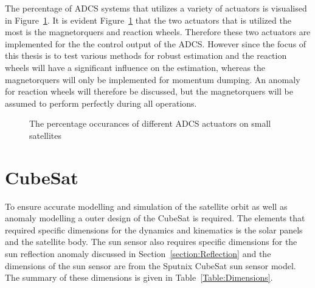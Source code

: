 The percentage of ADCS systems that utilizes a variety of actuators is visualised in Figure~\ref{fig:ActuatorOccurances}. It is evident Figure~\ref{fig:ActuatorOccurances} that the two actuators that is utilized the most is the magnetorquers and reaction wheels. Therefore these two actuators are implemented for the the control output of the ADCS. However since the focus of this thesis is to test various methods for robust estimation and the reaction wheels will have a significant influence on the estimation, whereas the magnetorquers will only be implemented for momentum dumping. An anomaly for reaction wheels will therefore be discussed, but the magnetorquers will be assumed to perform perfectly during all operations.

\begin{figure}
	\centering
	\caption{The percentage occurances of different ADCS actuators on small satellites}
	\label{fig:ActuatorOccurances}
\end{figure}

\section{CubeSat}
To ensure accurate modelling and simulation of the satellite orbit as well as anomaly modelling a outer design of the CubeSat is required. The elements that required specific dimensions for the dynamics and kinematics is the solar panels and the satellite body. The sun sensor also requires specific dimensions for the sun reflection anomaly discussed in Section~\ref{section:Reflection} and the dimensions of the sun sensor are from the Sputnix CubeSat sun sensor model. The summary of these dimensions is given in Table~\ref{Table:Dimensions}.

